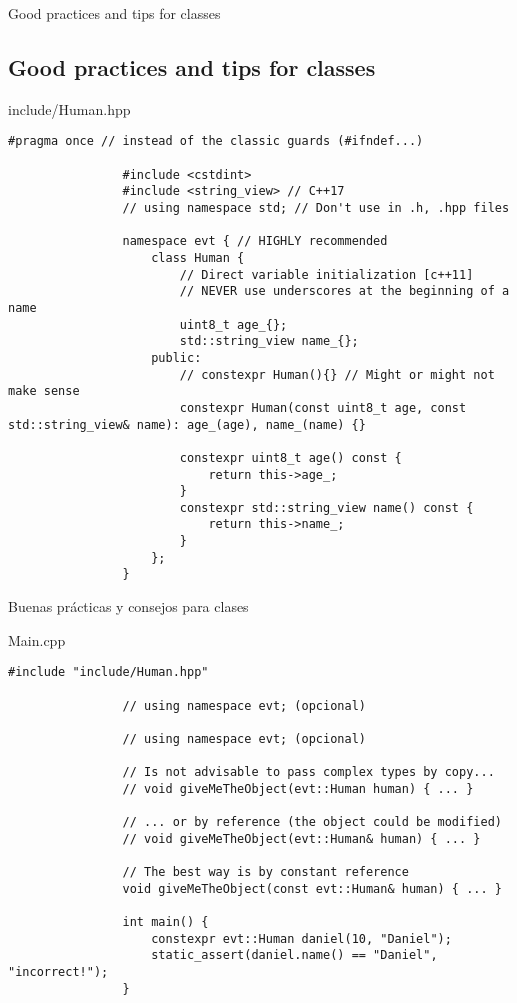 \documentclass{beamer}
\newcommand{\normalSizeItem}[1] {
  \normalsize{\item #1}
}
\begin{document}
		\begin{frame}[fragile]{Good practices and tips for classes}	
			\subsection{Good practices and tips for classes}
			\begin{itemize}
				\normalSizeItem { include/Human.hpp }
				\begin{lstlisting}[basicstyle={\tiny\ttfamily}]
				#pragma once // instead of the classic guards (#ifndef...)
				
				#include <cstdint>
				#include <string_view> // C++17
				// using namespace std; // Don't use in .h, .hpp files

				namespace evt { // HIGHLY recommended
					class Human {
						// Direct variable initialization [c++11]
						// NEVER use underscores at the beginning of a name
						uint8_t age_{};
						std::string_view name_{};
					public:
						// constexpr Human(){} // Might or might not make sense
						constexpr Human(const uint8_t age, const std::string_view& name): age_(age), name_(name) {}
						
						constexpr uint8_t age() const {  
							return this->age_;
						}
						constexpr std::string_view name() const { 
							return this->name_;
						}
					};
				}
				\end{lstlisting}
			\end{itemize}
		\end{frame}
		
		\begin{frame}[fragile]{Buenas prácticas y consejos para clases}	
			\begin{itemize}
				\normalSizeItem { Main.cpp }
				\begin{lstlisting}[basicstyle={\tiny\ttfamily}]
				#include "include/Human.hpp"
				
				// using namespace evt; (opcional)
				
				// using namespace evt; (opcional)
				
				// Is not advisable to pass complex types by copy...
				// void giveMeTheObject(evt::Human human) { ... }
				
				// ... or by reference (the object could be modified)
				// void giveMeTheObject(evt::Human& human) { ... }
				
				// The best way is by constant reference
				void giveMeTheObject(const evt::Human& human) { ... }
				
				int main() {
					constexpr evt::Human daniel(10, "Daniel");
					static_assert(daniel.name() == "Daniel", "incorrect!");
				}
				\end{lstlisting}
			\end{itemize}
		\end{frame}
		
\end{document}

